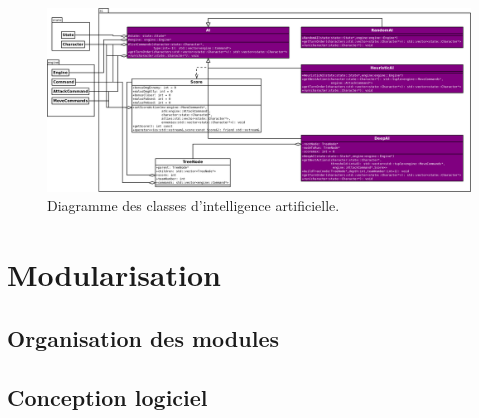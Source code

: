 \documentclass[a4paper,12pt]{article}
\begin{document}
\begin{landscape}
    \begin{figure}[p]
        \centering
        \includegraphics[width=0.9\paperheight,keepaspectratio]{ai.png}
        \caption{\label{uml:ai}Diagramme des classes d'intelligence artificielle.}
    \end{figure}
\end{landscape}


\section{Modularisation}
\label{sec:module}

\subsection{Organisation des modules}

\clearpage
\subsection{Conception logiciel}


%
\end{document}
